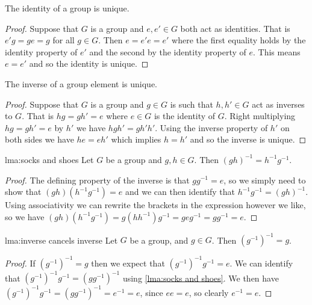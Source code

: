 \begin{lma}{}{}
    The identity of a group is unique.
    
    \begin{proof}
        Suppose that \(G\) is a group and \(e, e' \in G\) both act as identities.
        That is \(e'g = ge = g\) for all \(g \in G\).
        Then \(e = e'e = e'\) where the first equality holds by the identity property of \(e'\) and the second by the identity property of \(e\).
        This means \(e = e'\) and so the identity is unique.
    \end{proof}
\end{lma}

\begin{lma}{}{}
    The inverse of a group element is unique.
    
    \begin{proof}
        Suppose that \(G\) is a group and \(g \in G\) is such that \(h, h' \in G\) act as inverses to \(G\).
        That is \(hg = gh' = e\) where \(e \in G\) is the identity of \(G\).
        Right multiplying \(hg = gh' = e\) by \(h'\) we have \(hgh' = gh'h'\).
        Using the inverse property of \(h'\) on both sides we have \(he = eh'\) which implies \(h = h'\) and so the inverse is unique.
    \end{proof}
\end{lma}

\begin{lma}{}{lma:socks and shoes}
    Let \(G\) be a group and \(g, h \in G\).
    Then \((gh)^{-1} = h^{-1}g^{-1}\).
    \begin{proof}
        The defining property of the inverse is that \(gg^{-1} = e\), so we simply need to show that \((gh)(h^{-1}g^{-1}) = e\) and we can then identify that \(h^{-1}g^{-1} = (gh)^{-1}\).
        Using associativity we can rewrite the brackets in the expression however we like, so we have \((gh)(h^{-1}g^{-1}) = g(hh^{-1})g^{-1} = geg^{-1} = gg^{-1} = e\).
    \end{proof}
\end{lma}

\begin{lma}{}{lma:inverse cancels inverse}
    Let \(G\) be a group, and \(g \in G\).
    Then \((g^{-1})^{-1} = g\).
    \begin{proof}
        If \((g^{-1})^{-1} = g\) then we expect that \((g^{-1})^{-1}g^{-1} = e\).
        We can identify that \((g^{-1})^{-1}g^{-1} = (gg^{-1})^{-1}\) using \cref{lma:socks and shoes}.
        We then have \((g^{-1})^{-1}g^{-1} = (gg^{-1})^{-1} = e^{-1} = e\), since \(ee = e\), so clearly \(e^{-1} = e\).
    \end{proof}
\end{lma}

